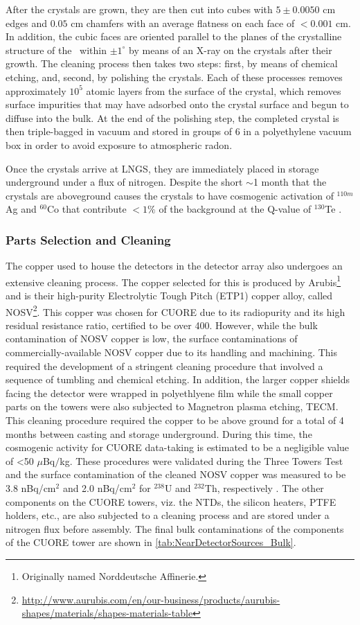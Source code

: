After the crystals are grown, they are then cut into cubes with $5 \pm 0.0050$ cm edges and $0.05$ cm chamfers with an average flatness on each face of $<0.001$ cm.
In addition, the cubic faces are oriented parallel to the planes of the crystalline structure of the \teotwo~within $\pm1^{\circ}$ by means of an X-ray on the crystals after their growth.
The cleaning process then takes two steps: first, by means of chemical etching, and, second, by polishing the crystals.
Each of these processes removes approximately $10^5$ atomic layers from the surface of the crystal, which removes surface impurities that may have adsorbed onto the crystal surface and begun to diffuse into the bulk.
At the end of the polishing step, the completed crystal is then triple-bagged in vacuum and stored in groups of 6 in a polyethylene vacuum box in order to avoid exposure to atmospheric radon.

Once the crystals arrive at LNGS, they are immediately placed in storage underground under a flux of nitrogen.
Despite the short $\sim$1 month that the crystals are aboveground causes the crystals to have cosmogenic activation of $^{110m}$Ag and $^{60}$Co that contribute $<1\%$ of the background at the Q-value of $^{130}$Te \cite{PhysRevC.92.024620, BARGHOUTY201316}.

\subsubsection{Parts Selection and Cleaning}
The copper used to house the detectors in the detector array also undergoes an extensive cleaning process.
The copper selected for this is produced by Arubis\footnote{Originally named Norddeutsche Affinerie.} and is their high-purity Electrolytic Tough Pitch (ETP1) copper alloy, called NOSV\footnote{\RaggedRight\url{http://www.aurubis.com/en/our-business/products/aurubis-shapes/materials/shapes-materials-table}}.
This copper was chosen for CUORE due to its radiopurity and its high residual resistance ratio, certified to be over 400.
However, while the bulk contamination of NOSV copper is low, the surface contaminations of commercially-available NOSV copper due to its handling and machining.
This required the development of a stringent cleaning procedure that involved a sequence of tumbling and chemical etching.
In addition, the larger copper shields facing the detector were wrapped in polyethlyene film while the small copper parts on the towers were also subjected to Magnetron plasma etching, TECM.
This cleaning procedure required the copper to be above ground for a total of 4 months between casting and storage underground.
During this time, the cosmogenic activity for CUORE data-taking is estimated to be a negligible value of <50 $\mu$Bq$/$kg.
These procedures were validated during the Three Towers Test  and the surface contamination of the cleaned NOSV copper was measured to be 3.8 nBq/cm$^2$ and 2.0 nBq/cm$^2$ for $^{238}$U and $^{232}$Th, respectively \cite{ALESSANDRIA201313}.
The other components on the CUORE towers, viz. the NTDs, the silicon heaters, PTFE holders, etc., are also subjected to a cleaning process and are stored under a nitrogen flux before assembly.
The final bulk contaminations of the components of the CUORE tower are shown in \autoref{tab:NearDetectorSources_Bulk}.


